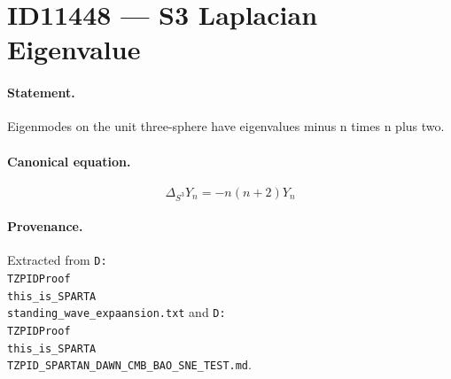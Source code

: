 \section*{ID11448 --- S3 Laplacian Eigenvalue}

\paragraph{Statement.}
Eigenmodes on the unit three-sphere have eigenvalues minus n times n plus two.

\paragraph{Canonical equation.}
\[
\Delta_{S^3}Y_n=-n(n+2)Y_n
\]

\paragraph{Provenance.}
Extracted from \texttt{D:\\TZPIDProof\\this\_is\_SPARTA\\standing\_wave\_expaansion.txt} and \texttt{D:\\TZPIDProof\\this\_is\_SPARTA\\TZPID\_SPARTAN\_DAWN\_CMB\_BAO\_SNE\_TEST.md}.
